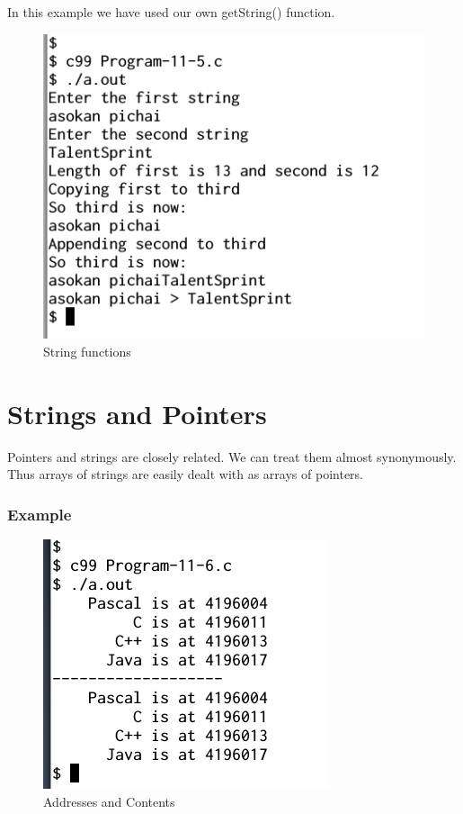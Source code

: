 \documentclass[11pt,a4paper]{article}
\begin{document}
In this example we have used our own getString() function.


\begin{figure}[ht]
\begin{center}
\includegraphics[scale=0.6]{Output-11-5.png}
\caption{String functions}
\label{output-11-5}
\end{center}
\end{figure}

\section*{Strings and Pointers}
Pointers and strings are closely related. We can treat them almost synonymously. Thus arrays of strings are easily dealt with as arrays of pointers.

\subsubsection*{Example}


\begin{figure}[ht]

\begin{center}
\includegraphics[scale=0.6]{Output-11-6.png}
\caption{Addresses and Contents}
\label{output-11-6}
\end{center}
\end{figure}
\end{document}
